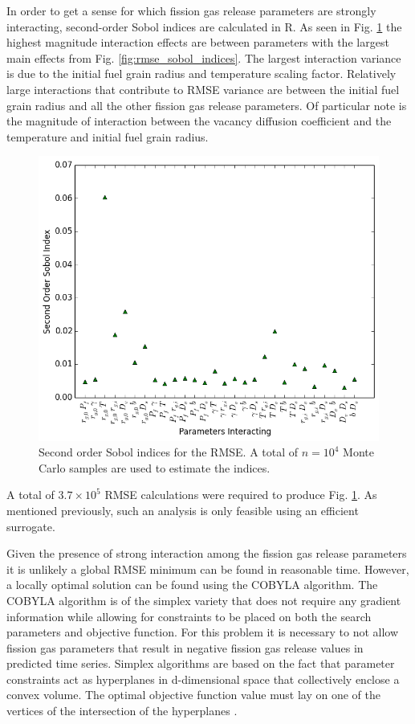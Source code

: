 In order to get a sense for which fission gas release parameters are strongly interacting, second-order Sobol indices are calculated in R. As seen in Fig. \ref{fig:rmse_sobol_indices_2nd_order} the highest magnitude interaction effects are between parameters with the largest main effects from Fig. \ref{fig:rmse_sobol_indices}. The largest interaction variance is due to the initial fuel grain radius and temperature scaling factor. Relatively large interactions that contribute to \ac{RMSE} variance are between the initial fuel grain radius and all the other fission gas release parameters. Of particular note is the magnitude of interaction between the vacancy diffusion coefficient and the temperature and initial fuel grain radius.     
\begin{figure}[!h]
\caption{\label{fig:rmse_sobol_indices_2nd_order}
Second order Sobol indices for the \ac{RMSE}. A total of $n=10^4$ Monte Carlo samples are used to estimate the indices.}
 \begin{center}
  \includegraphics[scale=.75]{./Chapter4/sobol_2nd_order.png}
 \end{center}
\end{figure}
A total of $3.7\times 10^5$ \ac{RMSE} calculations were required to produce Fig. \ref{fig:rmse_sobol_indices_2nd_order}. As mentioned previously, such an analysis is only feasible using an efficient surrogate.

Given the presence of strong interaction among the fission gas release parameters it is unlikely a global \ac{RMSE} minimum can be found in reasonable time. However, a locally optimal solution can be found using the \ac{COBYLA} algorithm. The \ac{COBYLA} algorithm is of the simplex variety that does not require any gradient information while allowing for constraints to be placed on both the search parameters and objective function. For this problem it is necessary to not allow fission gas parameters that result in negative fission gas release values in predicted time series. Simplex algorithms are based on the fact that parameter constraints act as hyperplanes in d-dimensional space that collectively enclose a convex volume. The optimal objective function value must lay on one of the vertices of the intersection of the hyperplanes \cite{Powell}. 

